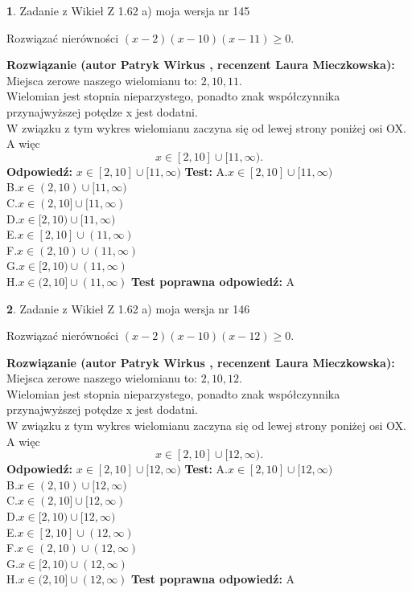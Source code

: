 \documentclass[12pt, a4paper]{article}
\theoremstyle{definition} %
\newtheorem{zad}{}
\newcommand{\zadStart}[1]{\begin{zad}#1\newline}
\newcommand{\zadStop}{\end{zad}}
\newcommand{\rozwStart}[2]{\noindent \textbf{Rozwiązanie (autor #1 , recenzent #2): }\newline}
\newcommand{\rozwStop}{\newline}
\newcommand{\odpStart}{\noindent \textbf{Odpowiedź:}\newline}
\newcommand{\odpStop}{\newline}
\newcommand{\testStart}{\noindent \textbf{Test:}\newline}
\newcommand{\testStop}{\newline}
\newcommand{\kluczStart}{\noindent \textbf{Test poprawna odpowiedź:}\newline}
\newcommand{\kluczStop}{\newline}
\begin{document}
\zadStart{Zadanie z Wikieł Z 1.62 a) moja wersja nr 145}

Rozwiązać nierówności $(x-2)(x-10)(x-11)\ge0$.
\zadStop
\rozwStart{Patryk Wirkus}{Laura Mieczkowska}
Miejsca zerowe naszego wielomianu to: $2, 10, 11$.\\
Wielomian jest stopnia nieparzystego, ponadto znak współczynnika przy\linebreak najwyższej potędze x jest dodatni.\\ W związku z tym wykres wielomianu zaczyna się od lewej strony poniżej osi OX. A więc $$x \in [2,10] \cup [11,\infty).$$
\rozwStop
\odpStart
$x \in [2,10] \cup [11,\infty)$
\odpStop
\testStart
A.$x \in [2,10] \cup [11,\infty)$\\
B.$x \in (2,10) \cup [11,\infty)$\\
C.$x \in (2,10] \cup [11,\infty)$\\
D.$x \in [2,10) \cup [11,\infty)$\\
E.$x \in [2,10] \cup (11,\infty)$\\
F.$x \in (2,10) \cup (11,\infty)$\\
G.$x \in [2,10) \cup (11,\infty)$\\
H.$x \in (2,10] \cup (11,\infty)$
\testStop
\kluczStart
A
\kluczStop



\zadStart{Zadanie z Wikieł Z 1.62 a) moja wersja nr 146}

Rozwiązać nierówności $(x-2)(x-10)(x-12)\ge0$.
\zadStop
\rozwStart{Patryk Wirkus}{Laura Mieczkowska}
Miejsca zerowe naszego wielomianu to: $2, 10, 12$.\\
Wielomian jest stopnia nieparzystego, ponadto znak współczynnika przy\linebreak najwyższej potędze x jest dodatni.\\ W związku z tym wykres wielomianu zaczyna się od lewej strony poniżej osi OX. A więc $$x \in [2,10] \cup [12,\infty).$$
\rozwStop
\odpStart
$x \in [2,10] \cup [12,\infty)$
\odpStop
\testStart
A.$x \in [2,10] \cup [12,\infty)$\\
B.$x \in (2,10) \cup [12,\infty)$\\
C.$x \in (2,10] \cup [12,\infty)$\\
D.$x \in [2,10) \cup [12,\infty)$\\
E.$x \in [2,10] \cup (12,\infty)$\\
F.$x \in (2,10) \cup (12,\infty)$\\
G.$x \in [2,10) \cup (12,\infty)$\\
H.$x \in (2,10] \cup (12,\infty)$
\testStop
\kluczStart
A
\kluczStop
\end{document}
